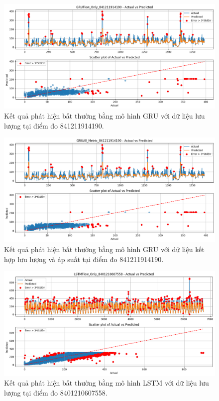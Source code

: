 \begin{figure}[H]
    \centering
    \includegraphics[width=\textwidth]{image/section6_3/anomaly_detection_841211914190_gru_flow.png}
    \caption{Kết quả phát hiện bất thường bằng mô hình GRU với dữ liệu lưu lượng tại điểm đo 841211914190.}
    \label{fig:anomaly_gru_841211914190_flow}
\end{figure}

\begin{figure}[H]
    \centering
    \includegraphics[width=\textwidth]{image/section6_3/anomaly_detection_841211914190_gru_allmetric.png}
    \caption{Kết quả phát hiện bất thường bằng mô hình GRU với dữ liệu kết hợp lưu lượng và áp suất tại điểm đo 841211914190.}
    \label{fig:anomaly_gru_841211914190_all}
\end{figure}

\begin{figure}[H]
    \centering
    \includegraphics[width=\textwidth]{image/section6_3/anomaly_detection_8401210607558_lstm_flow.png}
    \caption{Kết quả phát hiện bất thường bằng mô hình LSTM với dữ liệu lưu lượng tại điểm đo 8401210607558.}
    \label{fig:anomaly_lstm_8401210607558_flow}
\end{figure}

